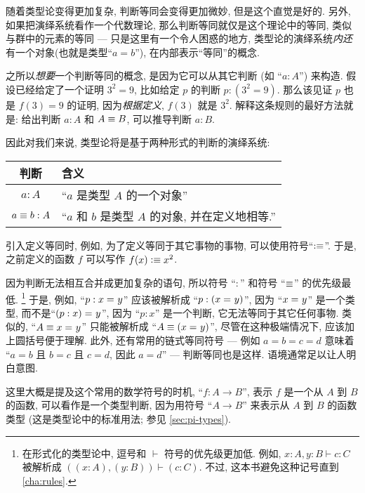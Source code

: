随着类型论变得更加复杂, 判断等同会变得更加微妙, 但是这个直觉是好的.
另外, 如果把演绎系统看作一个代数理论, 那么判断等同就仅是这个理论中的等同, 类似与群中的元素的等同 ---
只是这里有一个令人困惑的地方, 类型论的演绎系统\emph{内}\emph{还}有一个对象(也就是类型``$a=b$''), 在内部表示``等同''的概念.

之所以\emph{想要}一个判断等同的概念, 是因为它可以从其它判断 (如 ``$a:A$'') 来构造.
假设已经给定了一个证明 $3^2=9$, 比如给定 $p$ 的判断 $p:(3^2=9)$.
那么该见证 $p$ 也是 $f(3)=9$ 的证明, 因为\emph{根据定义}, $f(3)$ 就是 $3^2$.
解释这条规则的最好方法就是: 给出判断 $a:A$ 和 $A\equiv B$, 可以推导判断 $a:B$.

因此对我们来说, 类型论将是基于两种形式的判断的演绎系统:
\begin{center}
    \medskip
    \begin{tabular}{cl}
        \toprule
        判断              & 含义                                \\
        \midrule
        $a : A$         & ``$a$ 是类型 $A$ 的一个对象''             \\
        $a \equiv b : A$ & ``$a$ 和 $b$ 是类型 $A$ 的对象, 并在定义地相等.'' \\
        \bottomrule
    \end{tabular}
    \medskip
\end{center}%
%
引入定义等同时, 例如, 为了定义等同于其它事物的事物, 可以使用符号``$\vcentcolon\equiv$''.
于是, 之前定义的函数 $f$ 可以写作 $f(x)\vcentcolon\equiv x^2$.

因为判断无法相互合并成更加复杂的语句, 所以符号 ``$:$'' 和符号 ``$\equiv$'' 的优先级最低.
\footnote{在形式化的类型论中, 逗号和 $\vdash$ 符号的优先级更加低.
例如, $x:A,y:B\vdash c:C$ 被解析成 $((x:A),(y:B))\vdash (c:C)$.
不过, 这本书避免这种记号直到 \cref{cha:rules}.}
于是, 例如, ``$p:x =_{} y$'' 应该被解析成 ``$p:(x =_{} y)$'', 因为 ``$x =_{} y$'' 是一个类型, 而不是``$(p:x) =_{} y$'', 因为 ``$p:x$'' 是一个判断, 它无法等同于其它任何事物.
类似的, ``$A\equiv x =_{} y$'' 只能被解析成 ``$A\equiv(x =_{} y)$'', 尽管在这种极端情况下, 应该加上圆括号便于理解.
此外, 还有常用的链式等同符号 --- 例如 $a=b=c=d$ 意味着 ``$a=b$ 且 $b=c$ 且 $c=d$, 因此 $a=d$'' --- 判断等同也是这样.
语境通常足以让人明白意图.

这里大概是提及这个常用的数学符号的时机, ``$f:A\to B$'', 表示 $f$ 是一个从 $A$ 到 $B$ 的函数, 可以看作是一个类型判断, 因为用符号 ``$A\to B$'' 来表示从 $A$ 到 $B$ 的函数类型
(这是类型论中的标准用法;
参见 \cref{sec:pi-types}).

